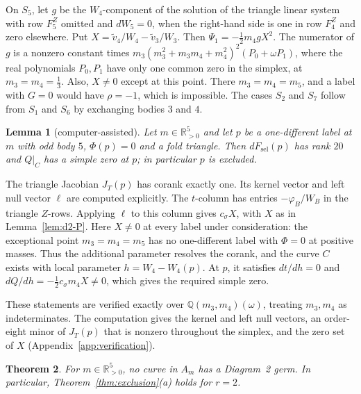 \documentclass[11pt]{amsart}
\newtheorem{theorem}{Theorem}[section]
\newtheorem{lemma}[theorem]{Lemma}
\theoremstyle{definition}
\theoremstyle{remark}
\newcommand{\Rp}{\mathbb{R}_{>0}}
\begin{document}
{On $S_5$, let $g$ be the $W_4$-component of the solution of the
triangle linear system with row $F^Z_5$ omitted and $dW_5=0$, when the right-hand side is
one in row $F^Z_4$ and zero elsewhere.  Put $X=\tilde v_4/W_4-\tilde v_3/W_3$.
Then $\Psi_1=-\frac12m_4gX^2$.
The numerator of $g$ is a nonzero constant times
$m_3(m_3^2+m_3m_4+m_4^2)^2(P_0+\omega P_1)$, where the real polynomials $P_0,P_1$ have
only one common zero in the simplex, at $m_3=m_4=\frac13$.
Also, $X\ne0$ except at this point.
There $m_3=m_4=m_5$, and a label with $G=0$ would have $\rho=-1$, which is impossible.
The cases $S_2$ and $S_7$ follow from $S_1$ and $S_6$ by exchanging bodies $3$ and $4$.}

\begin{lemma}[computer-assisted]\label{lem:d2-fold}
Let $m\in\Rp^5$ and let $p$ be a one-different label at $m$ with odd body $5$, $\Phi(p)=0$ and a
fold triangle.  Then $dF_{\mathrm{sel}}(p)$ has rank $20$ and $Q|_C$ has a simple zero at $p$; in
particular $p$ is excluded.
\end{lemma}

{The triangle Jacobian $J_T(p)$ has corank exactly one.
Its kernel vector and left null vector $\ell$ are computed explicitly.
The $t$-column has entries $-\varphi_B/W_B$ in the triangle $Z$-rows.
Applying $\ell$ to this column gives $c_\sigma X$, with $X$ as in
Lemma~\ref{lem:d2-P}.
Here $X\ne0$ at every label under consideration: the exceptional point $m_3=m_4=m_5$
has no one-different label with $\Phi=0$ at positive masses.
Thus the additional parameter resolves the corank, and the curve $C$ exists with local
parameter $h=W_4-W_4(p)$.
At $p$, it satisfies $dt/dh=0$ and $dQ/dh=-\frac12c_\sigma m_4X\ne0$, which gives the
required simple zero.

These statements are verified exactly over $\mathbb Q(m_3,m_4)(\omega)$, treating
$m_3,m_4$ as indeterminates.
The computation gives the kernel and left null vectors, an order-eight minor of
$J_T(p)$ that is nonzero throughout the simplex, and the zero set of $X$
(Appendix~\ref{app:verification}).}

\begin{theorem}\label{thm:d2}
{For $m\in\Rp^5$, no curve in $A_m$ has a Diagram~2 germ.
In particular, Theorem~\ref{thm:exclusion}\textup{(a)} holds for $r=2$.}
\end{theorem}
\end{document}
